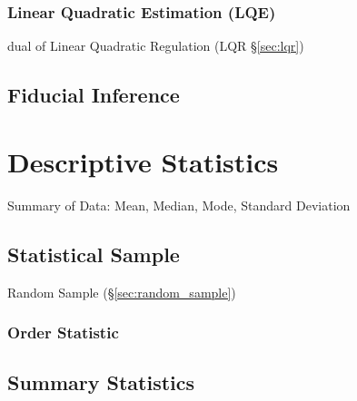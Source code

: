 \subsubsection{Linear Quadratic Estimation (LQE)}\label{sec:lqe}

dual of Linear Quadratic Regulation (LQR \S\ref{sec:lqr})



\subsection{Fiducial Inference}\label{sec:fiducial_inference}



\section{Descriptive Statistics}\label{sec:descriptive_statistics}

Summary of Data: Mean, Median, Mode, Standard Deviation



\subsection{Statistical Sample}\label{sec:statistical_sample}

Random Sample (\S\ref{sec:random_sample})



\subsubsection{Order Statistic}\label{sec:order_statistic}



\subsection{Summary Statistics}\label{sec:summary_statistics}

